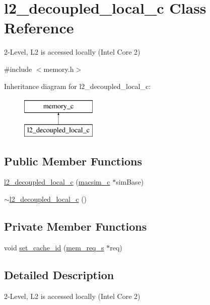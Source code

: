\hypertarget{classl2__decoupled__local__c}{
\section{l2\_\-decoupled\_\-local\_\-c Class Reference}
\label{classl2__decoupled__local__c}
}


2-\/Level, L2 is accessed locally (Intel Core 2)  




{\ttfamily \#include $<$memory.h$>$}

Inheritance diagram for l2\_\-decoupled\_\-local\_\-c:\begin{figure}[H]
\begin{center}
\leavevmode
\includegraphics[height=2.000000cm]{classl2__decoupled__local__c}
\end{center}
\end{figure}
\subsection*{Public Member Functions}
\begin{DoxyCompactItemize}
\item 
\hyperlink{classl2__decoupled__local__c_a06f0e007f417ffe7c3fe01e79d30d4f3}{l2\_\-decoupled\_\-local\_\-c} (\hyperlink{classmacsim__c}{macsim\_\-c} $\ast$simBase)
\item 
\hyperlink{classl2__decoupled__local__c_a7bfff94c2cb1ff669b3bf352208b8333}{$\sim$l2\_\-decoupled\_\-local\_\-c} ()
\end{DoxyCompactItemize}
\subsection*{Private Member Functions}
\begin{DoxyCompactItemize}
\item 
void \hyperlink{classl2__decoupled__local__c_a4c319b02982447d98079bf6649fa5c15}{set\_\-cache\_\-id} (\hyperlink{structmem__req__s}{mem\_\-req\_\-s} $\ast$req)
\end{DoxyCompactItemize}


\subsection{Detailed Description}
2-\/Level, L2 is accessed locally (Intel Core 2) 

